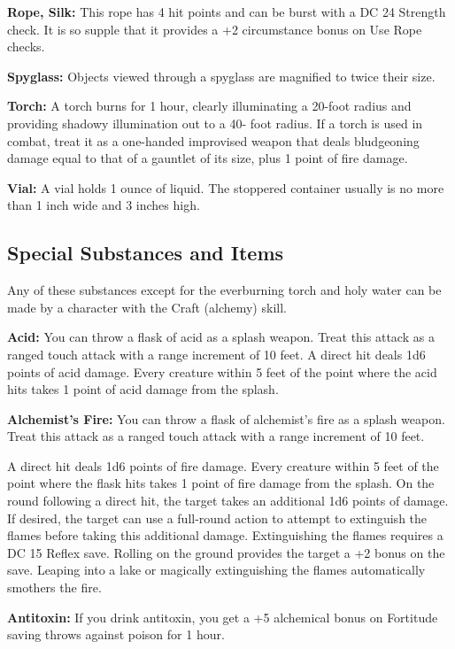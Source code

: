 \textbf{Rope, Silk:} This rope has 4 hit points and can be burst with a DC 24 Strength 
check. It is so supple that it provides a +2 circumstance bonus on Use Rope checks.

\textbf{Spyglass:} Objects viewed through a spyglass are magnified to twice their 
size.

\textbf{Torch:} A torch burns for 1 hour, clearly illuminating a 20-foot radius 
and providing shadowy illumination out to a 40- foot radius. If a torch is used 
in combat, treat it as a one-handed improvised weapon that deals bludgeoning damage 
equal to that of a gauntlet of its size, plus 1 point of fire damage.

\textbf{Vial:} A vial holds 1 ounce of liquid. The stoppered container usually 
is no more than 1 inch wide and 3 inches high.

\subsection{Special Substances and Items}

Any of these substances except for the everburning torch and holy water can be 
made by a character with the Craft (alchemy) skill.

\textbf{Acid:} You can throw a flask of acid as a splash weapon. Treat this attack 
as a ranged touch attack with a range increment of 10 feet. A direct hit deals 
1d6 points of acid damage. Every creature within 5 feet of the point where the 
acid hits takes 1 point of acid damage from the splash.

\textbf{Alchemist's Fire:} You can throw a flask of alchemist's fire as a splash 
weapon. Treat this attack as a ranged touch attack with a range increment of 10 
feet.

A direct hit deals 1d6 points of fire damage. Every creature within 5 feet of the 
point where the flask hits takes 1 point of fire damage from the splash. On the 
round following a direct hit, the target takes an additional 1d6 points of damage. 
If desired, the target can use a full-round action to attempt to extinguish the 
flames before taking this additional damage. Extinguishing the flames requires 
a DC 15 Reflex save. Rolling on the ground provides the target a +2 bonus on the 
save. Leaping into a lake or magically extinguishing the flames automatically smothers 
the fire.

\textbf{Antitoxin:} If you drink antitoxin, you get a +5 alchemical bonus on Fortitude 
saving throws against poison for 1 hour.

